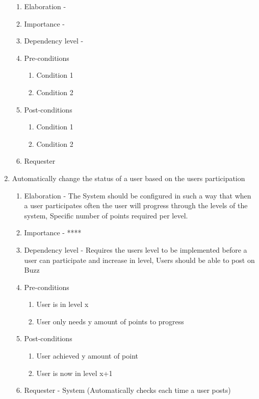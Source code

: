 \documentclass[12pt]{article}
\begin{document}
\begin{enumerate}
  \begin{enumerate}
    \item Elaboration - 
    \item Importance - 
    \item Dependency level - 
    \item Pre-conditions
    \begin{enumerate}
    	\item Condition 1
    	\item Condition 2
    \end{enumerate}
        \item Post-conditions
    \begin{enumerate}
    	\item Condition 1
    	\item Condition 2
    \end{enumerate}
    \item Requester
  \end{enumerate}
\newpage %
   \item Automatically change the status of a user based on the users participation %
  \begin{enumerate}
    \item Elaboration - The System should be configured in such a way that when a user participates often the user will progress through the levels of the system, Specific number of points required per level.
    \item Importance - ****
    \item Dependency level - Requires the users level to be implemented before a user can participate and increase in level, Users should be able to post on Buzz
    \item Pre-conditions
    \begin{enumerate}
    	\item User is in level x
    	\item User only needs y amount of points to progress
    \end{enumerate}
        \item Post-conditions
    \begin{enumerate}
    	\item User achieved y amount of point
    	\item User is now in level x+1
    \end{enumerate}
    \item Requester - System (Automatically checks each time a user posts)

\end{enumerate}
\end{enumerate}
\end{document}
